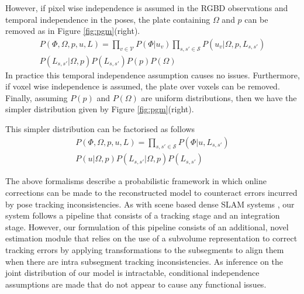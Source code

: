 However, if pixel wise independence is assumed in the RGBD observations and temporal independence in 
the poses, the plate containing $\Omega$ and $p$ can be removed as in Figure \ref{fig:pgm}(right).
\begin{equation}
\begin{split}
P(\Phi, \Omega, p, u, L) = 
\prod_{v \in \mathcal{V}}P(\Phi|u_{v})
\prod_{s, s' \in \mathcal{S}}P(u_{v}|\Omega, p, L_{s, s'}) \\
P(L_{s, s'}|\Omega, p) P(L_{s, s'})P(p)P(\Omega)
\end{split}
\end{equation}
In practice this temporal independence assumption causes no issues. Furthermore, if voxel wise independence is assumed, the plate over voxels can be removed. Finally, assuming $P(p)$ and 
$P(\Omega)$ are uniform distributions, then we have the simpler distribution given by Figure \ref{fig:pgm}(right).

This simpler distribution can be factorised as follows
\begin{equation}
\begin{split}
P(\Phi, \Omega, p, u, L) = 
\prod_{s, s' \in \mathcal{S}} P(\Phi|u, L_{s, s'}) \\
P(u|\Omega, p)
P(L_{s, s'}|\Omega, p)
P(L_{s, s'})
\end{split}
\end{equation}

The above formalisms describe a probabilistic framework in which online corrections can be made to the reconstructed model to counteract 
errors incurred by pose tracking inconsistencies. As with scene based dense SLAM systems \cite{Newcombe2011, Prisacariu2014, Niessner2013}, 
our system follows a pipeline that consists of a tracking stage and an integration stage. However, our formulation of this pipeline 
consists of an additional, novel estimation module that relies on the use of a subvolume representation to correct tracking errors by applying 
transformations to the subsegments to align them when there are intra subsegment tracking inconsistencies. 
As inference on the joint distribution of our model is intractable, conditional independence assumptions are made that do not appear 
to cause any functional issues.

